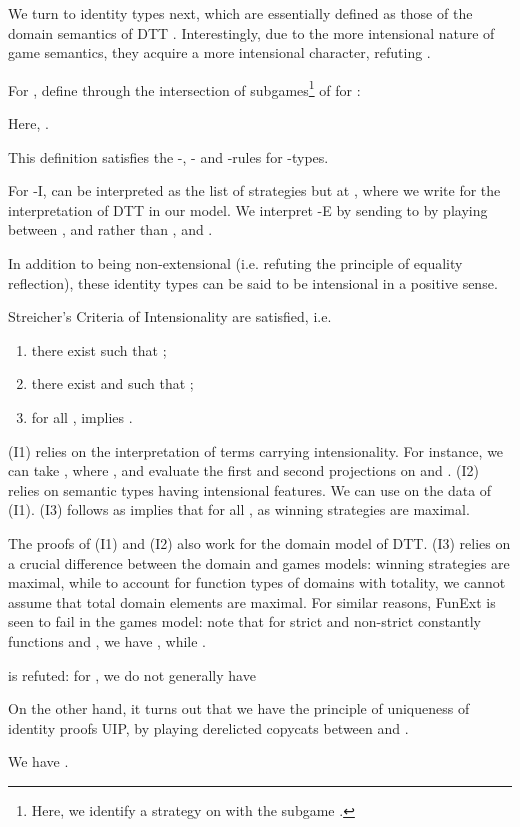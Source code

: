 \documentclass[runningheads,a4paper]{llncs}
\begin{document}
We turn to identity types next, which are essentially defined as those of the domain semantics of \textsf{DTT} \cite{palmgren1990domain}. Interestingly, due to the more intensional nature of game semantics, they acquire a more intensional character, refuting .

For , define  through the intersection of subgames\footnote{Here, we identify a strategy  on  with the subgame .} of  for :

Here, . 
\begin{theorem}
This definition satisfies the -, - and -rules for -types.
\end{theorem}
For -I,  can be interpreted as the list of strategies  but at , where we write  for the interpretation of \textsf{DTT} in our model. We interpret -E by sending  to  by playing  between ,  and  rather than ,  and .

In addition to being non-extensional (i.e. refuting the principle of equality reflection), these identity types can be said to be intensional in a positive sense.
\begin{theorem}Streicher's Criteria of Intensionality \cite{streicher1993investigations} are satisfied, i.e. \vspace{-4pt}
\begin{enumerate}
\item[(I1)] there exist  such that ;
\item[(I2)] there exist  and  such that  ;
\item[(I3)] for all ,  implies .
\end{enumerate}
\end{theorem}
(I1) relies on the interpretation of terms carrying intensionality. For instance, we can take , where , and evaluate the first and second projections on  and . (I2) relies on semantic types having intensional features. We can use  on the data of (I1). (I3) follows as  implies that  for all , as winning strategies are maximal.


The proofs of (I1) and (I2) also work for the domain model of \textsf{DTT}. (I3) relies on a crucial difference between the domain and games models: winning strategies are maximal, while to account for function types of domains with totality, we cannot assume that total domain elements are maximal. For similar reasons, \textsf{FunExt} is seen to fail in the games model: note that for strict and non-strict constantly  functions  and , we have , while .
\begin{theorem}\label{thm:id}  is refuted: for , we do not generally have 
\end{theorem}
On the other hand, it turns out that we have the principle of uniqueness of identity proofs \textsf{UIP}, by playing derelicted copycats between  and .
\begin{theorem}We have .
\end{theorem}
\end{document}
